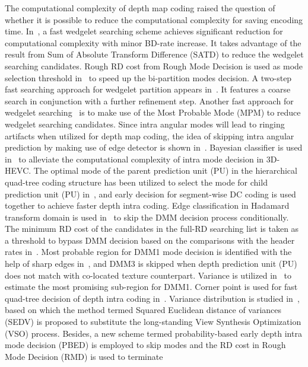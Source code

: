 The computational complexity of depth map coding
raised the question of whether it is possible to reduce the computational
complexity for saving encoding time.
In~\parencite{RN76}, a fast wedgelet searching scheme achieves significant
reduction for computational complexity with minor BD-rate increase.
It takes advantage of the result from
Sum of Absolute Transform Difference (SATD) to reduce the wedgelet searching
candidates.
Rough RD cost from Rough Mode Decision is used as mode selection threshold
in~\parencite{RN90} to speed up the bi-partition modes decision.
A two-step fast searching approach for wedgelet partition
appears in~\parencite{RN126}.
It features a coarse search in conjunction with a further refinement step.
Another fast approach for wedgelet searching~\parencite{RN79}
is to make use of the Most Probable Mode (MPM) to reduce wedgelet
searching candidates.
Since intra angular modes will lead to ringing artifacts
when utilized for depth map coding, the idea of skipping intra
angular prediction by making use of edge detector is shown in~\parencite{RN89}.
Bayesian classifier is used in~\parencite{RN102} to alleviate the computational
complexity of intra mode decision in 3D-HEVC\@.
The optimal mode of the parent prediction unit (PU)
in the hierarchical quad-tree coding structure has been utilized to select
the mode for child prediction unit (PU) in~\parencite{RN131}, and early
decision for segment-wise DC coding is used together to achieve faster
depth intra coding.
Edge classification in Hadamard transform domain is used in~\parencite{RN86}
to skip the DMM decision process conditionally.
The minimum RD cost of the candidates in the full-RD searching list is taken
as a threshold to bypass DMM decision based on the comparisons with the
header rates in~\parencite{RN93}.
Most probable region for DMM1 mode decision is identified with the help
of sharp edges in~\parencite{RN209}, and DMM3 is skipped when depth
prediction unit (PU) does not match with co-located texture counterpart.
Variance is utilized in~\parencite{RN210} to estimate the most promising
sub-region for DMM1.
Corner point is used for fast quad-tree decision of depth intra coding
in~\parencite{RN211}.
Variance distribution is studied in~\parencite{RN111}, based on which the
method termed Squared Euclidean distance of variances (SEDV) is
proposed to substitute the long-standing View Synthesis Optimization (VSO)
process.
Besides, a new scheme termed probability-based early depth intra mode
decision (PBED) is employed to skip modes and the RD cost in
Rough Mode Decision (RMD) is used to terminate
